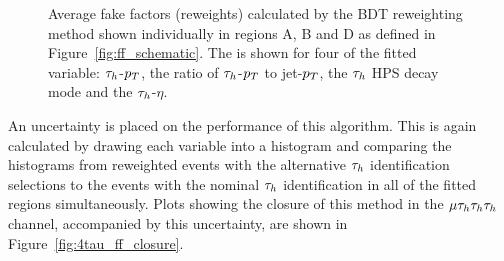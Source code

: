 \begin{figure}[!hbtp]
\caption[Plots of the average fake factors calculated by the BDT reweighter.]{Average fake factors (reweights) calculated by the BDT reweighting method shown individually in regions A, B and D as defined in Figure~\ref{fig:ff_schematic}. The is shown for four of the fitted variable: $\tau_{h}$-$p_{T}$, the ratio of $\tau_{h}$-$p_{T}$ to jet-$p_{T}$, the $\tau_{h}$ HPS decay mode and the $\tau_{h}$-$\eta$.}
\label{fig:4tau_ff_reweights}
\end{figure}

An uncertainty is placed on the performance of this algorithm.
This is again calculated by drawing each variable into a histogram and comparing the histograms from reweighted events with the alternative $\tau_{h}$ identification selections to the events with the nominal $\tau_{h}$ identification in all of the fitted regions simultaneously.
Plots showing the closure of this method in the $\mu\tau_{h}\tau_{h}\tau_{h}$ channel, accompanied by this uncertainty, are shown in Figure~\ref{fig:4tau_ff_closure}. \\

